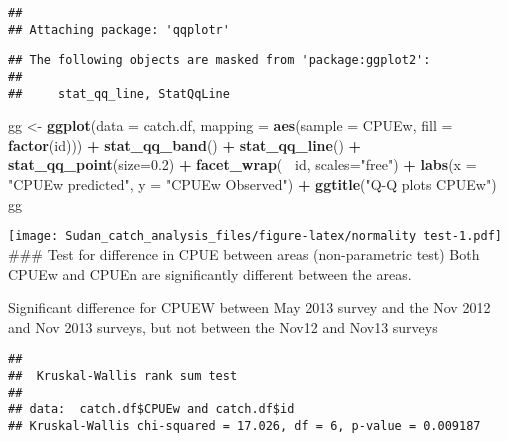 \documentclass[]{article}
\newenvironment{Shaded}{\begin{snugshade}}{\end{snugshade}}
\newcommand{\KeywordTok}[1]{\textcolor[rgb]{0.13,0.29,0.53}{\textbf{#1}}}
\newcommand{\DataTypeTok}[1]{\textcolor[rgb]{0.13,0.29,0.53}{#1}}
\newcommand{\FloatTok}[1]{\textcolor[rgb]{0.00,0.00,0.81}{#1}}
\newcommand{\StringTok}[1]{\textcolor[rgb]{0.31,0.60,0.02}{#1}}
\newcommand{\CommentTok}[1]{\textcolor[rgb]{0.56,0.35,0.01}{\textit{#1}}}
\newcommand{\OperatorTok}[1]{\textcolor[rgb]{0.81,0.36,0.00}{\textbf{#1}}}
\newcommand{\NormalTok}[1]{#1}
\begin{document}
\begin{verbatim}
## 
## Attaching package: 'qqplotr'
\end{verbatim}

\begin{verbatim}
## The following objects are masked from 'package:ggplot2':
## 
##     stat_qq_line, StatQqLine
\end{verbatim}

\begin{Shaded}
\begin{Highlighting}[]
\NormalTok{gg <-}\StringTok{ }\KeywordTok{ggplot}\NormalTok{(}\DataTypeTok{data =}\NormalTok{ catch.df, }\DataTypeTok{mapping =} \KeywordTok{aes}\NormalTok{(}\DataTypeTok{sample =}\NormalTok{ CPUEw,  }\DataTypeTok{fill =} \KeywordTok{factor}\NormalTok{(id))) }\OperatorTok{+}\StringTok{ }\KeywordTok{stat_qq_band}\NormalTok{() }\OperatorTok{+}\StringTok{ }\KeywordTok{stat_qq_line}\NormalTok{() }\OperatorTok{+}\StringTok{ }\KeywordTok{stat_qq_point}\NormalTok{(}\DataTypeTok{size=}\FloatTok{0.2}\NormalTok{) }\OperatorTok{+}\StringTok{ }\KeywordTok{facet_wrap}\NormalTok{(}\OperatorTok{~}\StringTok{ }\NormalTok{id, }\DataTypeTok{scales=}\StringTok{"free"}\NormalTok{) }\OperatorTok{+}\StringTok{  }\KeywordTok{labs}\NormalTok{(}\DataTypeTok{x =} \StringTok{"CPUEw predicted"}\NormalTok{, }\DataTypeTok{y =} \StringTok{"CPUEw Observed"}\NormalTok{) }\OperatorTok{+}\StringTok{ }\KeywordTok{ggtitle}\NormalTok{(}\StringTok{"Q-Q plots CPUEw"}\NormalTok{)}
\NormalTok{gg}
\end{Highlighting}
\end{Shaded}

\texttt{[image: Sudan\_catch\_analysis\_files/figure-latex/normality test-1.pdf]}
\#\#\# Test for difference in CPUE between areas (non-parametric test)
Both CPUEw and CPUEn are significantly different between the areas.

Significant difference for CPUEW between May 2013 survey and the Nov
2012 and Nov 2013 surveys, but not between the Nov12 and Nov13 surveys

\begin{Shaded}
\end{Shaded}

\begin{verbatim}
## 
##  Kruskal-Wallis rank sum test
## 
## data:  catch.df$CPUEw and catch.df$id
## Kruskal-Wallis chi-squared = 17.026, df = 6, p-value = 0.009187
\end{verbatim}
\end{document}
